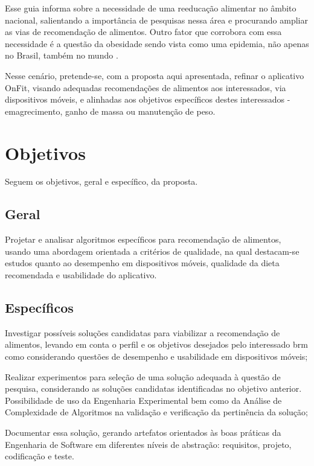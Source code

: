 Esse guia informa sobre a necessidade de uma reeducação alimentar no âmbito
nacional, salientando a importância de pesquisas nessa área e procurando ampliar as vias
de recomendação de alimentos. Outro fator que corrobora com essa necessidade é a
questão da obesidade sendo vista como uma epidemia, não apenas no Brasil, também no
mundo \cite{art_obesidade}.

Nesse cenário, pretende-se, com a proposta aqui apresentada, refinar o aplicativo
OnFit, visando adequadas recomendações de alimentos aos interessados, via
dispositivos móveis, e alinhadas aos objetivos específicos destes interessados -
emagrecimento, ganho de massa ou manutenção de peso.

\section{Objetivos}

Seguem os objetivos, geral e específico, da proposta.
\subsection{Geral}

Projetar e analisar algoritmos específicos para recomendação de alimentos,
usando uma abordagem orientada a critérios de qualidade, na qual destacam-se estudos
quanto ao desempenho em dispositivos móveis, qualidade da dieta recomendada e
usabilidade do aplicativo.

\subsection{Específicos}

Investigar possíveis soluções candidatas para viabilizar a recomendação de
alimentos, levando em conta o perfil e os objetivos desejados pelo interessado brm como considerando
questões de desempenho e usabilidade em dispositivos móveis;

Realizar experimentos para seleção de uma solução adequada à questão de
pesquisa, considerando as soluções candidatas identificadas no objetivo anterior.
Possibilidade de uso da Engenharia Experimental bem como da Análise de
Complexidade de Algoritmos na validação e verificação da pertinência da
solução;

Documentar essa solução, gerando artefatos orientados às boas práticas da
Engenharia de Software em diferentes níveis de abstração: requisitos, projeto,
codificação e teste.

